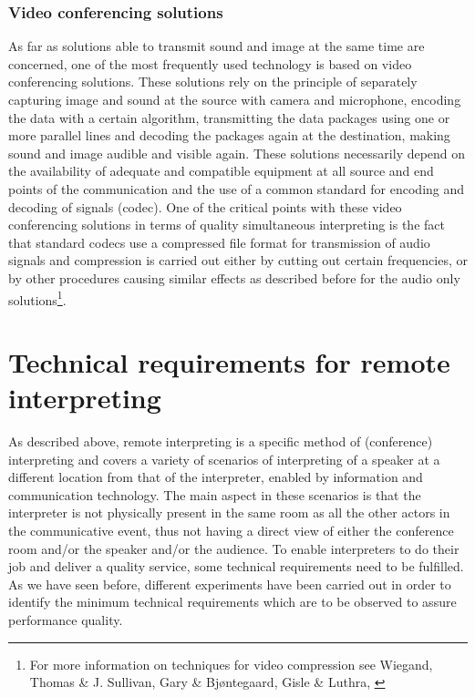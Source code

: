 \documentclass[output=paper]{langsci/langscibook}
\begin{document}
\subsubsection{Video conferencing solutions}

As far as solutions able to transmit sound and image at the same time are concerned, one of the most frequently used technology is based on video conferencing solutions. These solutions rely on the principle of separately capturing image and sound at the source with camera and microphone, encoding the data with a certain algorithm, transmitting the data packages using one or more parallel lines and decoding the packages again at the destination, making sound and image audible and visible again. These solutions necessarily depend on the availability of adequate and compatible equipment at all source and end points of the communication and the use of a common standard for encoding and decoding of signals (codec). One of the critical points with these video conferencing solutions in terms of quality simultaneous interpreting is the fact that standard codecs use a compressed file format for transmission of audio signals and compression is carried out either by cutting out certain frequencies, or by other procedures causing similar effects as described before for the audio only solutions\footnote{For more information on techniques for video compression see Wiegand, Thomas \& J. Sullivan, Gary \& Bjøntegaard, Gisle \& Luthra, \citealt{Ajay2003}}.

\section{Technical requirements for remote interpreting}

As described above, remote interpreting is a specific method of (conference) interpreting and covers a variety of scenarios of interpreting of a speaker at a different location from that of the interpreter, enabled by information and communication technology. The main aspect in these scenarios is that the interpreter is not physically present in the same room as all the other actors in the communicative event, thus not having a direct view of either the conference room and/or the speaker and/or the audience. To enable interpreters to do their job and deliver a quality service, some technical requirements need to be fulfilled. As we have seen before, different experiments have been carried out in order to identify the minimum technical requirements which are to be observed to assure performance quality.
\end{document}
